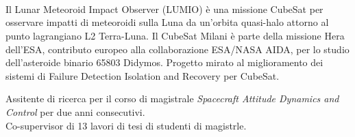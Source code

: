 \documentclass[
	a4paper,
	sidecolor=gray!8,
	sectioncolor=materialblue,
	subsectioncolor=materialindigo,
	profilepicsize=3.5cm,
	profilepicstyle=profilecircle,
	profilepiczoom=1.15,
]{sixtysecondscv}
\begin{document}
\begin{cvtable}[1.5]
\\
\\
\\
\end{cvtable}


\begin{cvtable}[1.5]
	{Il Lunar Meteoroid Impact Observer (LUMIO) è una missione CubeSat per osservare impatti di meteoroidi sulla Luna da un'orbita quasi-halo attorno al punto lagrangiano L2 Terra-Luna.}
	{Il CubeSat Milani è parte della missione Hera dell'ESA, contributo europeo alla collaborazione ESA/NASA AIDA, per lo studio dell'asteroide binario 65803 Didymos.}
	{Progetto mirato al miglioramento dei sistemi di  Failure Detection Isolation and Recovery per CubeSat.}
\end{cvtable}


Assitente di ricerca per il corso di magistrale \textit{Spacecraft Attitude Dynamics and Control} per due anni consecutivi.\\

Co-supervisor di 13 lavori di tesi di studenti di magistrle.\\
\end{document}
